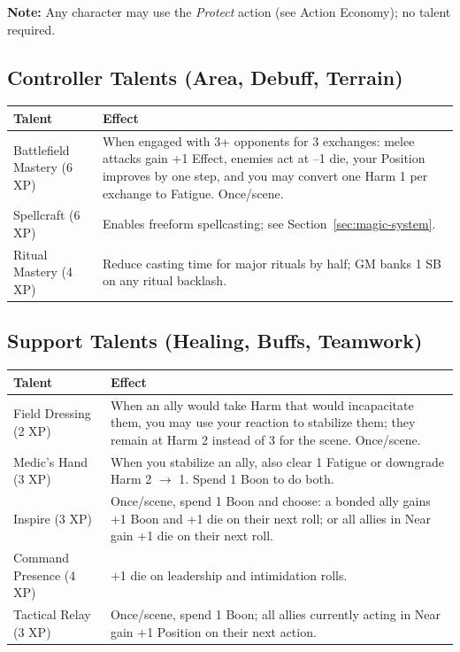 \textbf{Note:} Any character may use the \textit{Protect} action (see Action Economy); no talent required.

\subsection{Controller Talents (Area, Debuff, Terrain)}

\begin{tabular}{@{}lp{10cm}@{}}
\toprule
\textbf{Talent} & \textbf{Effect} \\
\midrule
Battlefield Mastery (6 XP) & When engaged with 3+ opponents for 3 exchanges: melee attacks gain +1 Effect, enemies act at –1 die, your Position improves by one step, and you may convert one Harm 1 per exchange to Fatigue. Once/scene. \\
Spellcraft (6 XP) & Enables freeform spellcasting; see Section~\ref{sec:magic-system}. \\
Ritual Mastery (4 XP) & Reduce casting time for major rituals by half; GM banks 1 SB on any ritual backlash. \\
\bottomrule
\end{tabular}

\subsection{Support Talents (Healing, Buffs, Teamwork)}

\begin{tabular}{@{}lp{10cm}@{}}
\toprule
\textbf{Talent} & \textbf{Effect} \\
\midrule
Field Dressing (2 XP) & When an ally would take Harm that would incapacitate them, you may use your reaction to stabilize them; they remain at Harm 2 instead of 3 for the scene. Once/scene. \\
Medic's Hand (3 XP) & When you stabilize an ally, also clear 1 Fatigue or downgrade Harm 2 $\rightarrow$ 1. Spend 1 Boon to do both. \\
Inspire (3 XP) & Once/scene, spend 1 Boon and choose: a bonded ally gains +1 Boon and +1 die on their next roll; or all allies in Near gain +1 die on their next roll. \\
Command Presence (4 XP) & +1 die on leadership and intimidation rolls. \\
Tactical Relay (3 XP) & Once/scene, spend 1 Boon; all allies currently acting in Near gain +1 Position on their next action. \\
\bottomrule
\end{tabular}

